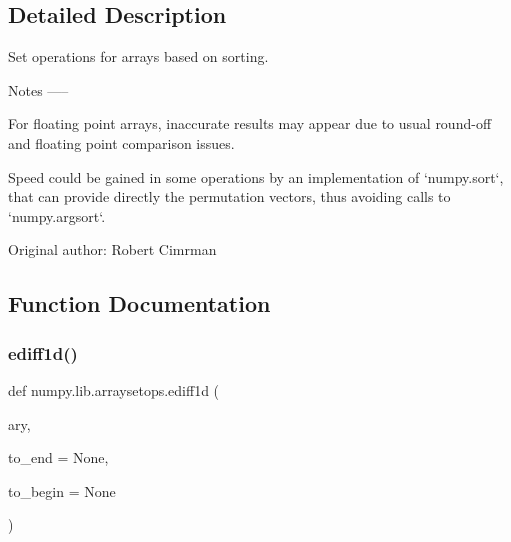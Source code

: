 \subsection{Detailed Description}
\begin{DoxyVerb}Set operations for arrays based on sorting.

Notes
-----

For floating point arrays, inaccurate results may appear due to usual round-off
and floating point comparison issues.

Speed could be gained in some operations by an implementation of
`numpy.sort`, that can provide directly the permutation vectors, thus avoiding
calls to `numpy.argsort`.

Original author: Robert Cimrman\end{DoxyVerb}
 

\subsection{Function Documentation}
\mbox{\label{namespacenumpy_1_1lib_1_1arraysetops_ad44482da19257c39a92f4f75472bd9cc}} 
\subsubsection{\texorpdfstring{ediff1d()}{ediff1d()}}
{\footnotesize\ttfamily def numpy.\+lib.\+arraysetops.\+ediff1d (\begin{DoxyParamCaption}\item[{}]{ary,  }\item[{}]{to\+\_\+end = {\ttfamily None},  }\item[{}]{to\+\_\+begin = {\ttfamily None} }\end{DoxyParamCaption})}

